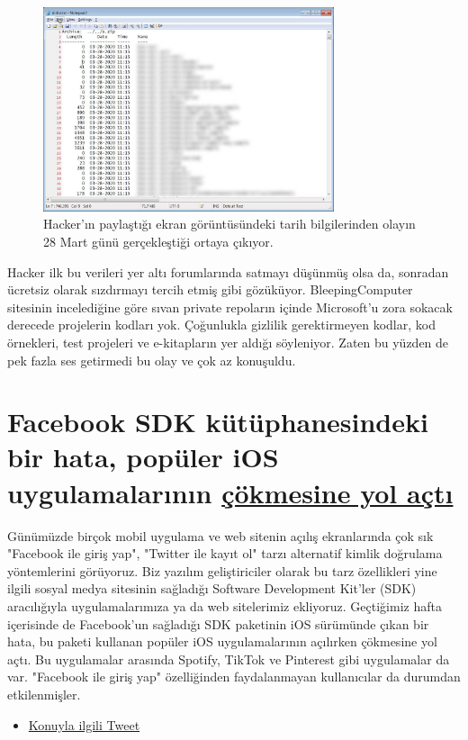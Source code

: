\documentclass[11pt]{article}
\begin{document}
\begin{figure}[htbp]
\centering
\includegraphics[height=6cm]{gorseller/microsoft-github-leak.jpg}
\caption{Hacker'ın paylaştığı ekran görüntüsündeki tarih bilgilerinden olayın 28 Mart günü gerçekleştiği ortaya çıkıyor.}
\end{figure}

Hacker ilk bu verileri yer altı forumlarında satmayı düşünmüş olsa da,
sonradan ücretsiz olarak sızdırmayı tercih etmiş gibi gözüküyor.
BleepingComputer sitesinin incelediğine göre sıvan private repoların içinde
Microsoft'u zora sokacak derecede projelerin kodları yok. Çoğunlukla gizlilik
gerektirmeyen kodlar, kod örnekleri, test projeleri ve e-kitapların yer aldığı
söyleniyor. Zaten bu yüzden de pek fazla ses getirmedi bu olay ve çok az
konuşuldu.
\section{Facebook SDK kütüphanesindeki bir hata, popüler iOS uygulamalarının \href{https://www.theverge.com/2020/5/7/21250689/facebook-sdk-bug-ios-app-crash-apple-spotify-venmo-tiktok-tinder}{çökmesine yol açtı}}
\label{sec:org6ff6f4d}
Günümüzde birçok mobil uygulama ve web sitenin açılış ekranlarında çok sık
"Facebook ile giriş yap", "Twitter ile kayıt ol" tarzı alternatif kimlik
doğrulama yöntemlerini görüyoruz. Biz yazılım geliştiriciler olarak bu tarz
özellikleri yine ilgili sosyal medya sitesinin sağladığı Software Development
Kit'ler (SDK) aracılığıyla uygulamalarımıza ya da web sitelerimiz ekliyoruz.
Geçtiğimiz hafta içerisinde de Facebook'un sağladığı SDK paketinin iOS
sürümünde çıkan bir hata, bu paketi kullanan popüler iOS uygulamalarının
açılırken çökmesine yol açtı. Bu uygulamalar arasında Spotify, TikTok ve
Pinterest gibi uygulamalar da var. "Facebook ile giriş yap" özelliğinden
faydalanmayan kullanıcılar da durumdan etkilenmişler.

\begin{itemize}
\item \href{https://twitter.com/aburninghilll/status/1258169688959352832}{Konuyla ilgili Tweet}
\end{itemize}
\end{document}
